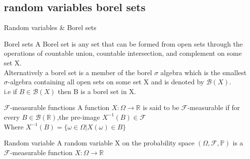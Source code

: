 \documentclass{beamer}
\begin{document}
\subsection{random variables borel sets}
\begin{frame}{Random variables \& Borel sets}
\begin{block}{Borel sets}
      A Borel set is any set that can be formed from open sets through the operations of countable union, countable intersection, and complement on some set X.\\
      Alternatively a borel set is a member of the borel \(\sigma\) algebra which is the smallest \(\sigma\)-algebra containing all open sets on some set X and is denoted by \(\mathcal{B}(X)\).\\
      i.e if \(B \in \mathcal{B}(X)\) then B is a borel set in X.
\end{block}
\end{frame}
\begin{frame}
\begin{block}{\(\mathcal{F}\)-measurable functions}
   A function \(X:\Omega \to \mathbb{R}\) is said to be \(\mathcal{F}\)-measurable if for every
   \(B \in \mathcal{B}(\mathbb{R})\),the pre-image \(X^{-1}(B) \in \mathcal{F}\)\\
   Where \(X^{-1}(B)=\{\omega \in \Omega|X(\omega) \in B\}\)
\end{block}
\begin{block}{Random variable}
     A random variable X on the probability space \((\Omega,\mathcal{F},\mathbb{P})\) is a \(\mathcal{F}\)-measurable function \(X:\Omega \to \mathbb{R}\)
\end{block}
\end{frame}
\end{document}
